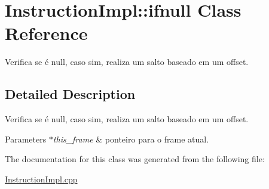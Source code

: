 \hypertarget{class_instruction_impl_1_1ifnull}{}\section{Instruction\+Impl\+:\+:ifnull Class Reference}
\label{class_instruction_impl_1_1ifnull}


Verifica se é null, caso sim, realiza um salto baseado em um offset.  




\subsection{Detailed Description}
Verifica se é null, caso sim, realiza um salto baseado em um offset. 


\begin{DoxyParams}{Parameters}
{\em $\ast$this\+\_\+frame} & ponteiro para o frame atual.  \\
\hline
\end{DoxyParams}


The documentation for this class was generated from the following file\+:\begin{DoxyCompactItemize}
\item 
\hyperlink{_instruction_impl_8cpp}{Instruction\+Impl.\+cpp}\end{DoxyCompactItemize}
